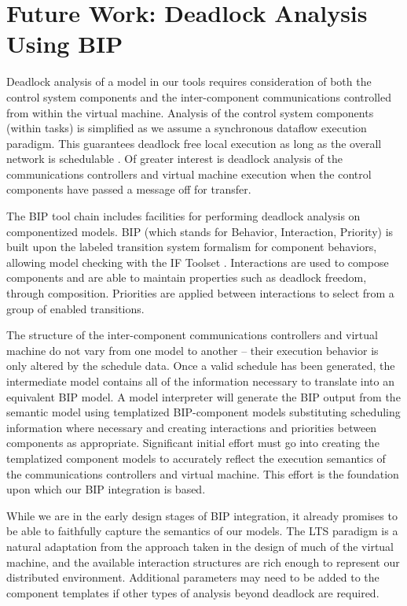 \section{Future Work: Deadlock Analysis Using BIP}

Deadlock analysis of a model in our tools requires consideration of both the control system 
components and the inter-component communications controlled from within the virtual machine.  
Analysis of the control system components (within tasks) is simplified as we assume a 
synchronous dataflow execution paradigm. This guarantees deadlock free local execution as 
long as the overall network is schedulable \cite{moc:sdf}.  Of greater interest is deadlock 
analysis of the communications controllers and virtual machine execution when the control 
components have passed a message off for transfer.

The BIP \cite{verif:basu, verif:BIPFramework} tool chain includes facilities for performing 
deadlock analysis on componentized models.  BIP (which stands for Behavior, Interaction, 
Priority) is built upon the labeled transition system formalism for component behaviors, 
allowing model checking with the IF Toolset  \cite{verif:IFToolset}. Interactions are used 
to compose components and are able to maintain properties such as deadlock freedom, through 
composition.  Priorities are applied between interactions to select from a group of enabled 
transitions.

The structure of the inter-component communications controllers and virtual machine do not 
vary from one model to another -- their execution behavior is only altered by the schedule 
data.  Once a valid schedule has been generated, the intermediate model contains all of the 
information necessary to translate into an equivalent BIP model.  A model interpreter will 
generate the BIP output from the semantic model using templatized BIP-component models 
substituting scheduling information where necessary and creating interactions and priorities 
between components as appropriate. Significant initial effort must go into creating the 
templatized component models to accurately reflect the execution semantics of the communications 
controllers and virtual machine.  This effort is the foundation upon which our BIP integration 
is based.

While we are in the early design stages of BIP integration, it already promises to be able to 
faithfully capture the semantics of our models.  The LTS paradigm is a natural adaptation from 
the approach taken in the design of much of the virtual machine, and the available interaction 
structures are rich enough to represent our distributed environment. Additional parameters may 
need to be added to the component templates if other types of analysis beyond deadlock are required.
